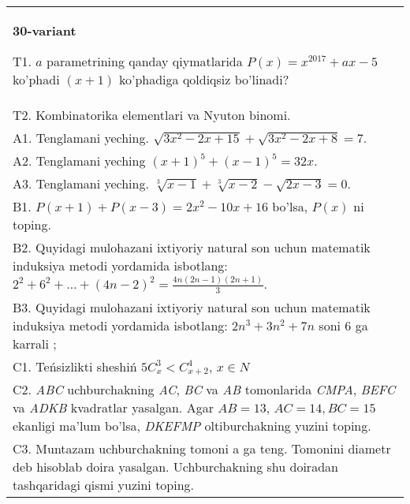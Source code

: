 \documentclass{article}
\begin{document}
\begin{tabular}{m{17cm}}
\textbf{30-variant}
\newline

T1. \(a\) parametrining qanday qiymatlarida \(P(x) = x^{2017} + ax - 5\) ko'phadi \((x + 1)\) ko'phadiga qoldiqsiz bo'linadi? \\
T2. Kombinatorika elementlari va Nyuton binomi. \\
A1. Tenglamani yeching. \(\sqrt{3x^{2} - 2x + 15} + \sqrt{3x^{2} - 2x + 8} = 7\). \\
A2. Tenglamani yeching \((x + 1)^{5} + (x - 1)^{5} = 32x\). \\
A3. Tenglamani yeching. \(\sqrt[3]{x - 1} + \sqrt[3]{x - 2} - \sqrt{2x - 3} = 0\). \\
B1. \(P(x + 1) + P(x - 3) = 2x^{2} - 10x + 16\) bo'lsa, \(P(x)\) ni toping. \\
B2. Quyidagi mulohazani ixtiyoriy natural son uchun matematik induksiya metodi yordamida isbotlang: \(2^{2} + 6^{2} + \ldots + (4n - 2)^{2} = \frac{4n(2n - 1)(2n + 1)}{3}\). \\
B3. Quyidagi mulohazani ixtiyoriy natural son uchun matematik induksiya metodi yordamida isbotlang: \(2n^{3} + 3n^{2} + 7n\) soni 6 ga karrali ; \\
C1. Teńsizlikti sheshiń \(5C_{x}^{3} < C_{x + 2}^{4}\), \(x \in N\) \\
C2. \emph{ABC} uchburchakning \emph{AC}, \emph{BC} va \emph{AB} tomonlarida \emph{CMPA}, \emph{BEFC} va \emph{ADKB} kvadratlar yasalgan. Agar \(AB = 13\), \(AC = 14,BC = 15\) ekanligi ma'lum bo'lsa, \emph{DKEFMP} oltiburchakning yuzini toping. \\
C3. Muntazam uchburchakning tomoni a ga teng. Tomonini diametr deb hisoblab doira yasalgan. Uchburchakning shu doiradan tashqaridagi qismi yuzini toping. \\

\end{tabular}
\vspace{1cm}
\end{document}
